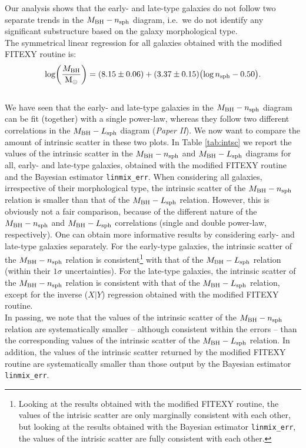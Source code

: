 \documentclass[preprint2]{emulateapj}
\begin{document}
Our analysis shows that the early- and late-type galaxies do not follow two separate trends in the $M_{\rm BH} - n_{\rm sph}$ diagram, 
i.e.~we do not identify any significant substructure based on the galaxy morphological type. \\
The symmetrical linear regression for all galaxies obtained with the modified FITEXY routine is: 
\begin{equation*}
\log \biggl( \frac{M_{\rm BH}}{\rm M_\odot} \biggr) = (8.15 \pm 0.06) + (3.37 \pm 0.15) \bigl(\log n_{\rm sph} - 0.50 \bigr) . 
\end{equation*}
\\

We have seen that the early- and late-type galaxies in the $M_{\rm BH} - n_{\rm sph}$ diagram 
can be fit (together) with a single power-law, 
whereas they follow two different correlations in the $M_{\rm BH} - L_{\rm sph}$ diagram (\emph{Paper II}). 
We now want to compare the amount of intrinsic scatter in these two plots. 
In Table \ref{tab:intsc} we report the values of the intrinsic scatter 
in the $M_{\rm BH} - n_{\rm sph}$ and $M_{\rm BH} - L_{\rm sph}$ diagrams 
for all, early- and late-type galaxies, 
obtained with the modified FITEXY routine and the Bayesian estimator {\tt linmix\_err}. 
When considering all galaxies, irrespective of their morphological type, 
the intrinsic scatter of the $M_{\rm BH} - n_{\rm sph}$ relation is smaller than that of the $M_{\rm BH} - L_{\rm sph}$ relation. 
However, this is obviously not a fair comparison, 
because of the different nature of the $M_{\rm BH} - n_{\rm sph}$ and $M_{\rm BH} - L_{\rm sph}$ correlations 
(single and double power-law, respectively). 
One can obtain more informative results by considering early- and late-type galaxies separately. 
For the early-type galaxies, the intrinsic scatter of the $M_{\rm BH} - n_{\rm sph}$ relation is consistent\footnote{Looking 
at the results obtained with the modified FITEXY routine, 
the values of the intrisic scatter are only marginally consistent with each other, 
but looking at the results obtained with the Bayesian estimator {\tt linmix\_err}, 
the values of the intrisic scatter are fully consistent with each other. } 
with that of the $M_{\rm BH} - L_{\rm sph}$ relation (within their $1\sigma$ uncertainties). 
For the late-type galaxies, the intrinsic scatter of the $M_{\rm BH} - n_{\rm sph}$ relation is consistent with 
that of the $M_{\rm BH} - L_{\rm sph}$ relation, 
except for the inverse ($X|Y$) regression obtained with the modified FITEXY routine. \\
In passing, we note that the values of the intrinsic scatter of the $M_{\rm BH} - n_{\rm sph}$ relation 
are systematically smaller -- although consistent within the errors -- 
than the corresponding values of the intrinsic scatter of the $M_{\rm BH} - L_{\rm sph}$ relation.  
In addition, the values of the intrinsic scatter returned by the modified FITEXY routine are systematically smaller than 
those output by the Bayesian estimator {\tt linmix\_err}. 
\end{document}
